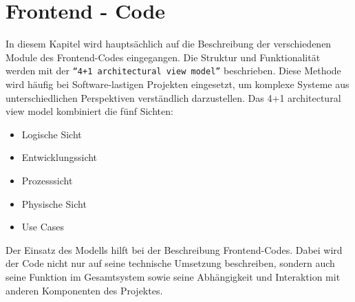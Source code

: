 \section{Frontend - Code}
\label{subsec:frontend_Code}
In diesem Kapitel wird hauptsächlich auf die Beschreibung der verschiedenen Module des
Frontend-Codes eingegangen. Die Struktur und Funktionalität werden mit der \texttt{``4+1 architectural view model''} beschrieben.
%
Diese Methode wird häufig bei Software-lastigen Projekten eingesetzt, um komplexe Systeme aus unterschiedlichen
Perspektiven verständlich darzustellen.
Das 4+1 architectural view model kombiniert die fünf Sichten:
\begin{itemize}
  \item Logische Sicht
  \item Entwicklungssicht
  \item Prozesssicht
  \item Physische Sicht
  \item Use Cases
\end{itemize} 
Der Einsatz des Modells hilft bei der Beschreibung Frontend-Codes. 
Dabei wird der Code nicht nur auf seine technische Umsetzung beschreiben,
sondern auch seine Funktion im Gesamtsystem 
sowie seine Abhängigkeit und Interaktion mit anderen Komponenten des Projektes.

